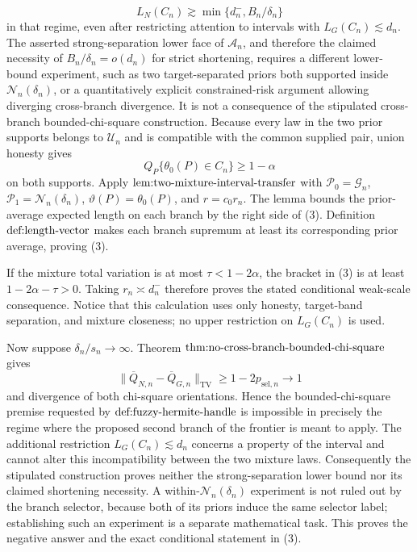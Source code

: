 \[
 L_N(C_n)\gtrsim\min\{d_n^-,B_n/\delta_n\}
\]
in that regime, even after restricting attention to intervals with \(L_G(C_n)\lesssim d_n\).  The asserted strong-separation lower face of \(\mathcal A_n\), and therefore the claimed necessity of \(B_n/\delta_n=o(d_n)\) for strict shortening, requires a different lower-bound experiment, such as two target-separated priors both supported inside \(\mathcal N_n(\delta_n)\), or a quantitatively explicit constrained-risk argument allowing diverging cross-branch divergence.  It is not a consequence of the stipulated cross-branch bounded-chi-square construction.
Because every law in the two prior supports belongs to \(\mathcal U_n\) and is compatible with the common supplied pair, union honesty gives
\[
 Q_P\{\theta_0(P)\in C_n\}\ge1-\alpha
\]
on both supports.  Apply \(\textup{lem:two-mixture-interval-transfer}\) with \(\mathcal P_0=\mathcal G_n\), \(\mathcal P_1=\mathcal N_n(\delta_n)\), \(\vartheta(P)=\theta_0(P)\), and \(r=c_0r_n\).  The lemma bounds the prior-average expected length on each branch by the right side of (3).  Definition \(\textup{def:length-vector}\) makes each branch supremum at least its corresponding prior average, proving (3).

If the mixture total variation is at most \(\tau<1-2\alpha\), the bracket in (3) is at least \(1-2\alpha-\tau>0\).  Taking \(r_n\asymp d_n^-\) therefore proves the stated conditional weak-scale consequence.  Notice that this calculation uses only honesty, target-band separation, and mixture closeness; no upper restriction on \(L_G(C_n)\) is used.

Now suppose \(\delta_n/s_n\to\infty\).  Theorem \(\textup{thm:no-cross-branch-bounded-chi-square}\) gives
\[
 \|\overline Q_{N,n}-\overline Q_{G,n}\|_{\mathrm{TV}}
 \ge1-2p_{\mathrm{sel},n}\longrightarrow1
\]
and divergence of both chi-square orientations.  Hence the bounded-chi-square premise requested by \(\textup{def:fuzzy-hermite-handle}\) is impossible in precisely the regime where the proposed second branch of the frontier is meant to apply.  The additional restriction \(L_G(C_n)\lesssim d_n\) concerns a property of the interval and cannot alter this incompatibility between the two mixture laws.  Consequently the stipulated construction proves neither the strong-separation lower bound nor its claimed shortening necessity.  A within-\(\mathcal N_n(\delta_n)\) experiment is not ruled out by the branch selector, because both of its priors induce the same selector label; establishing such an experiment is a separate mathematical task.  This proves the negative answer and the exact conditional statement in (3).
